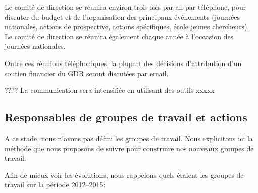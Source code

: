 \documentclass[11pt]{article}
\begin{document}
Le comité de direction se réunira environ trois fois par an par téléphone, pour
discuter du budget et de l'organisation des
principaux événements (journées nationales, actions de prospective, actions
spécifiques, école jeunes chercheurs). Le comité de direction se réunira
également chaque année à l'occasion des journées nationales.

Outre ces réunions téléphoniques, la plupart des décisions d'attribution d'un
soutien financier du GDR seront discutées par email.

???? 
La communication sera intensifiée en utilisant des outils xxxxx



\subsection{Responsables de groupes de travail et actions}
A ce stade, nous n'avons pas défini les groupes de travail.
Nous explicitons ici la méthode que nous proposons de suivre pour construire nos nouveaux groupes de travail.


Afin de mieux voir les évolutions, nous rappelons quels étaient les groupes de travail sur
la période 2012--2015:
\end{document}
